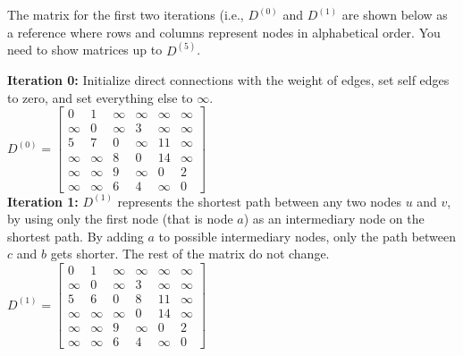 \documentclass[addpoints,11pt,answers]{exam}
\begin{document}
\begin{questions}

The matrix for the first two iterations (i.e., $D^{(0)}$ and $D^{(1)}$ are shown below as a reference where rows and columns represent nodes in alphabetical order. You need to show matrices up to $D^{(5)}$.

{\bf Iteration 0:} Initialize direct connections with the weight of edges, set self edges to zero, and set everything else to $\infty$. \\
$D^{(0)}=\begin{bmatrix}
 0 & 1 & \infty & \infty & \infty & \infty \\
 \infty & 0 & \infty & 3 & \infty & \infty \\
 5 & 7 & 0 & \infty & 11 & \infty \\
 \infty & \infty & 8 & 0 & 14 & \infty \\
 \infty & \infty & 9 & \infty & 0 & 2 \\
 \infty & \infty & 6 & 4 & \infty & 0 
\end{bmatrix}$\\

{\bf Iteration 1:} $D^{(1)}$ represents the shortest path between any two nodes $u$ and $v$, by using only the first node (that is node $a$) as an intermediary node on the shortest path. By adding $a$ to possible intermediary nodes, only the path between $c$ and $b$ gets shorter. The rest of the matrix do not change. \\
$D^{(1)}=\begin{bmatrix}
 0 & 1 & \infty & \infty & \infty & \infty \\
 \infty & 0 & \infty & 3 & \infty & \infty \\
 5 & 6 & 0 & 8 & 11 & \infty \\
 \infty & \infty & \infty & 0 & 14 & \infty \\
 \infty & \infty & 9 & \infty & 0 & 2 \\
 \infty & \infty & 6 & 4 & \infty & 0 
\end{bmatrix}$\\


\end{questions}
\end{document}
